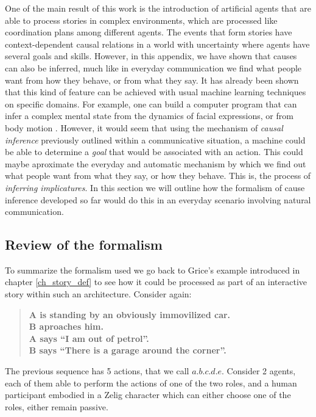 \documentclass[
		twoside,openright,titlepage,numbers=noenddot,manychapters,
		headinclude,%
                footinclude=false,cleardoublepage=empty,
                BCOR=5mm,
		fontsize=11pt, %
                 enabledeprecatedfontcommands]{scrreprt}
\begin{document}
One of the main result of this work is the introduction of artificial agents that are able to process stories in complex environments, which are processed like coordination plans among different agents. The events that form stories have context-dependent causal relations in a world with uncertainty where agents have several goals and skills. However, in this appendix, we have shown that causes can also be inferred, much like in everyday communication we find what people want from how they behave, or from what they say. It has already been shown that this kind of feature can be achieved with usual machine learning techniques on specific domains. For example, one can build a computer program that can infer a complex mental state from the dynamics of facial expressions, or from body motion \cite[]{el2004real,bernhardt2007detecting}. However, it would seem that using the mechanism of \emph{causal inference} previously outlined within a communicative situation, a machine could be able to determine a \emph{goal} that would be associated with an action. This could maybe aproximate the everyday and automatic mechanism by which we find out what people want from what they say, or how they behave. This is, the process of \emph{inferring implicatures}. In this section we will outline how the formalism of cause inference developed so far would do this in an everyday scenario involving natural communication.

\subsection{Review of the formalism}
To summarize the formalism used  we go back to Grice's example introduced in chapter \ref{ch_story_def} to see how it could be processed as part of an interactive story within such an architecture. Consider again: 
\begin{quote}
\begin{small}\bf
A is standing by an obviously immovilized car.\\
 B aproaches him. \\
A says ``I am out of petrol''. \\
B says ``There is a garage around the corner''. \\
\end{small}
\end{quote}
The previous sequence has 5 actions, that we call $a.b.c.d.e$. Consider 2 agents, each of them able to perform the actions of one of the two roles, and a human participant embodied in a Zelig character which can either choose one of the roles, either remain passive. 
\end{document}
